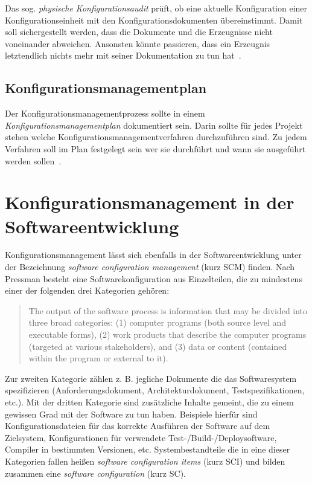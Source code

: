 \documentclass[runningheads,a4paper]{uwsese}
\begin{document}
Das sog. {\em physische Konfigurationsaudit} prüft, ob eine aktuelle
Konfiguration einer Konfigurationseinheit mit den Konfigurationsdokumenten
übereinstimmt. Damit soll sichergestellt werden, dass die Dokumente und die
Erzeugnisse nicht voneinander abweichen. Ansonsten könnte passieren, dass
ein Erzeugnis letztendlich nichts mehr mit seiner Dokumentation zu tun
hat~\cite[S. 7]{weischedel2002}.

\subsection{Konfigurationsmanagementplan}
Der Konfigurationsmanagementprozess sollte in einem
{\em Konfigurationsmanagementplan} dokumentiert sein. Darin sollte für jedes
Projekt stehen welche Konfigurationsmanagementverfahren durchzuführen sind. Zu
jedem Verfahren soll im Plan festgelegt sein wer sie durchführt und wann sie
ausgeführt werden sollen~\cite[S. 7f]{weischedel2002}.


\section{Konfigurationsmanagement in der Softwareentwicklung}

Konfigurationsmanagement lässt sich ebenfalls in der Softwareentwicklung
unter der Bezeichnung {\em software configuration management} (kurz SCM)
finden. Nach Pressman \cite[p. 585f]{Pressman:2009:SEP:1593949} besteht eine
Softwarekonfiguration aus Einzelteilen, die zu mindestens einer der folgenden
drei Kategorien gehören:

\begin{quote}
  The output of the software process is information that may be divided into three
  broad categories: (1) computer programs (both source level and executable forms),
  (2) work products that describe the computer programs (targeted at various
  stakeholders), and (3) data or content (contained within the program or external
  to it).
\end{quote}

Zur zweiten Kategorie zählen z. B. jegliche Dokumente die das Softwaresystem
spezifizieren (Anforderungsdokument, Architekturdokument, Testspezifikationen, etc.).
Mit der dritten Kategorie sind zusätzliche Inhalte gemeint, die zu einem gewissen
Grad mit der Software zu tun haben. Beispiele hierfür sind Konfigurationsdateien
für das korrekte Ausführen der Software auf dem Zielsystem, Konfigurationen für
verwendete Test-/Build-/Deploysoftware, Compiler in bestimmten Versionen, etc.
Systembestandteile die in eine dieser Kategorien fallen heißen
{\em software configuration items} (kurz SCI) und bilden zusammen eine
{\em software configuration} (kurz SC).
\end{document}
